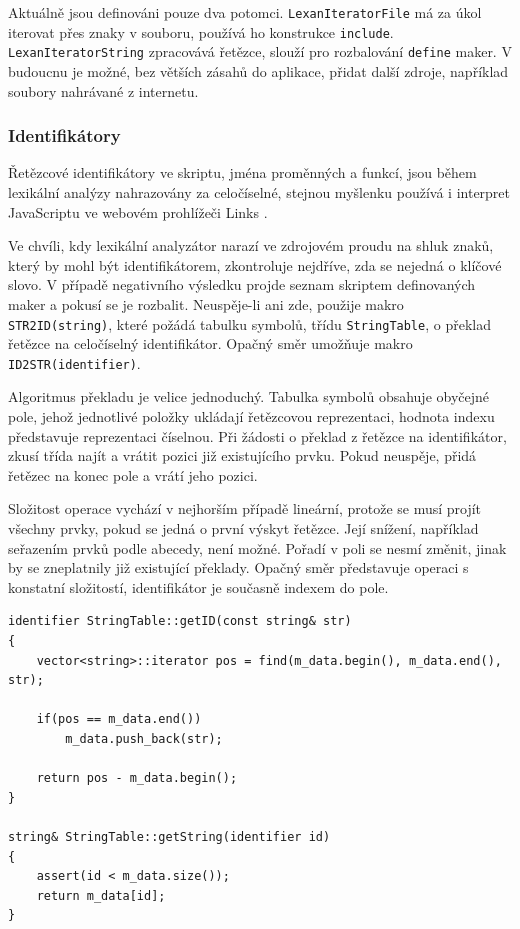 \documentclass[11pt,twoside,a4paper]{book}
\begin{document}
Aktuálně jsou definováni pouze dva potomci. \texttt{LexanIteratorFile} má za úkol iterovat přes znaky v souboru, používá ho konstrukce \texttt{include}. \texttt{Le\-xan\-Ite\-ra\-tor\-String} zpracovává ře\-těz\-ce, slouží pro rozbalování \texttt{define} maker. V budoucnu je možné, bez větších zásahů do aplikace, přidat další zdroje, například soubory nahrávané z internetu.


\subsubsection{Identifikátory}
\label{identifikatory}

Řetězcové identifikátory ve skriptu, jména proměnných a funkcí, jsou během lexikální analýzy nahrazovány za celočíselné, stejnou myšlenku používá i interpret JavaScriptu ve webovém prohlížeči Links \cite[str. 25]{links}.

Ve chvíli, kdy lexikální analyzátor narazí ve zdrojovém proudu na shluk znaků, který by mohl být identifikátorem, zkontroluje nejdříve, zda se nejedná o klíčové slovo. V případě negativního výsledku projde seznam skriptem definovaných maker a pokusí se je rozbalit. Neuspěje-li ani zde, použije makro \texttt{STR2ID(string)}, které požádá tabulku symbolů, třídu \texttt{StringTable}, o překlad řetězce na celočíselný identifikátor. Opačný směr umožňuje makro \texttt{ID2STR(identifier)}.

Algoritmus překladu je velice jednoduchý. Tabulka symbolů obsahuje obyčejné pole, jehož jednotlivé položky ukládají řetězcovou reprezentaci, hodnota indexu představuje reprezentaci číselnou. Při žádosti o překlad z řetězce na identifikátor, zkusí třída najít a vrátit pozici již existujícího prvku. Pokud neuspěje, přidá řetězec na konec pole a vrátí jeho pozici.

Složitost operace vychází v nejhorším případě lineární, protože se musí projít všechny prvky, pokud se jedná o první výskyt řetězce. Její snížení, například seřazením prvků podle abecedy, není možné. Pořadí v poli se nesmí změnit, jinak by se zneplatnily již existující překlady. Opačný směr představuje operaci s konstatní složitostí, identifikátor je současně indexem do pole.

\begin{verbatim}
identifier StringTable::getID(const string& str)
{
    vector<string>::iterator pos = find(m_data.begin(), m_data.end(), str);

    if(pos == m_data.end())
        m_data.push_back(str);

    return pos - m_data.begin();
}

string& StringTable::getString(identifier id)
{
    assert(id < m_data.size());
    return m_data[id];
}
\end{verbatim}
\end{document}
